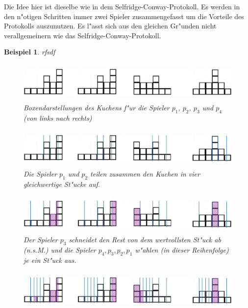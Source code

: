 \documentclass[11pt, a4paper, twoside]{article}
\newcommand{\wf}{\color{white}}
\newtheorem{bsp}[satz]{Beispiel}
\numberwithin{equation}{section}
\begin{document}
\newline
\newline
\newline
Die Idee hier ist dieselbe wie in dem Selfridge-Conway-Protokoll. Es werden in den n"otigen Schritten immer zwei Spieler zusammengefasst um die Vorteile des Protokolls auszunutzen. Es l"asst sich aus den gleichen Gr"unden nicht verallgemeinern wie das Selfridge-Conway-Protokoll.\newpage
\begin{bsp}\wf rfsdf
\begin{figure}[h!]
\includegraphics[height=2cm]{btz1.jpg}
\caption[Beispiel zum Brams,Taylors \& Zwickers Moving-Knife-Protokoll 1/5]{Boxendarstellungen des Kuchens f"ur die Spieler $p_1$, $p_2$, $p_3$ und $p_4$ (von links nach rechts)}
\end{figure}
\begin{figure}[h!]
\includegraphics[height=2cm]{btz3.jpg}
\caption[Beispiel zum Brams,Taylors \& Zwickers Moving-Knife-Protokoll 2/5]{Die Spieler $p_1$ und $p_2$ teilen zusammen den Kuchen in vier gleichwertige St"ucke auf.}
\end{figure}
\begin{figure}[h!]
\includegraphics[height=2cm]{btz6.jpg}
\caption[Beispiel zum Brams,Taylors \& Zwickers Moving-Knife-Protokoll 3/5]{Der Spieler $p_3$ schneidet den Rest von dem wertvollsten St"uck ab (n.s.M.) und die Spieler $p_4,p_3,p_2,p_1$ w"ahlen (in dieser Reihenfolge) je ein St"uck aus.}
\end{figure}
\begin{figure}[h!]
\includegraphics[height=2cm]{btz9.jpg}

\end{figure}
\end{bsp}
\end{document}
